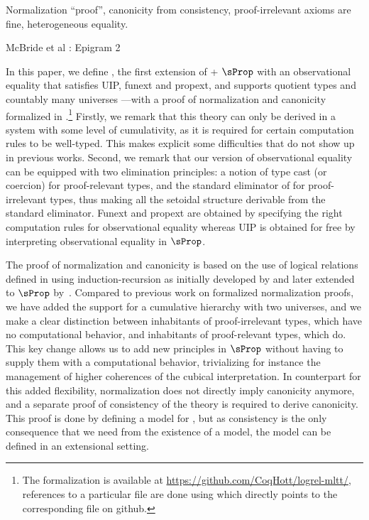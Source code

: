 Normalization ``proof'', canonicity from consistency, proof-irrelevant axioms 
are fine, heterogeneous equality.

McBride et al : Epigram 2

In this paper, we define \SetoidTT, the first extension of \MLTT +
$\sProp$ with an observational equality that satisfies UIP, funext
and propext, and supports quotient types and countably many universes
---with a proof of normalization and canonicity formalized in \Agda.\footnote{The formalization is available at
  \url{https://github.com/CoqHott/logrel-mltt/}, references to a
  particular file are done using  which
  directly points to the corresponding file on github.}
%
Firstly, we remark that this theory can only be derived in a system with
some level of cumulativity, as it is required for certain
computation rules to be well-typed. This makes explicit some difficulties
that do not show up in previous works.
%
Second, we remark that our version of observational equality can be equipped
with two elimination principles: a notion of type cast (or coercion) for
proof-relevant types, and the standard eliminator of \MLTT for
proof-irrelevant types, thus making all the setoidal structure
derivable from the standard eliminator.
%
Funext and propext are obtained by specifying the right
computation rules for observational equality whereas UIP is obtained
for free by interpreting observational equality in $\sProp$.

The proof of normalization and canonicity is based on the use
of logical relations defined in \Agda using induction-recursion as
initially developed by  and later extended to
$\sProp$ by~.
%
Compared to previous work on formalized normalization proofs, we have added the support
for a cumulative hierarchy with two universes, and we make a clear distinction
between inhabitants of proof-irrelevant types, which have no computational
behavior, and inhabitants of proof-relevant types, which do.
%
This key change allows us to add new principles in $\sProp$ without
having to supply them with a computational behavior, trivializing for
instance the management of higher coherences of the cubical interpretation.
%
In counterpart for this added flexibility, normalization does not directly
imply canonicity anymore, and a separate proof of consistency of the
theory is required to derive canonicity.
%
This proof is done by defining a model for \SetoidTT, but as
consistency is the only consequence that we need from the existence of
a model, the model can be defined in an extensional setting.

